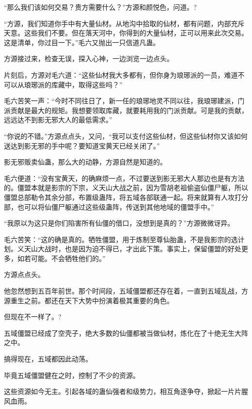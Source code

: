 
\begin{this_body}



“那么我们该如何交易？贵方需要什么？”方源和颜悦色，问道。?

“方源，我们知道你手中有大量仙材。从地沟中拾取的仙材，都有问题，内部充斥天意。这些我们不要。但在落天河中，你得到的大量仙材，正可以用来此次交易。这是清单，你过目一下。”毛六又抛出一只信道凡蛊。

方源接过来，检查无误，探入心神，一边浏览一边点头。

片刻后，方源对毛六道：“这些仙材我大多都有，但你身为琅琊派的一员，难道不可以从琅琊派的库藏中，取得这些吗？”

毛六苦笑一声：“今时不同往日了，新一任的琅琊地灵不同以往，我琅琊建派，门派贡献是最大的规矩。我想要领取库藏，就要耗用我的门派贡献。可是我的贡献，远远达不到影无邪大人的最低需求。”

“你说的不错。”方源点点头，又问，“我可以支付这些仙材，但这些仙材你又该如何送达到影无邪的手中呢？要知道宝黄天已经关闭了。”

影无邪贩卖仙蛊，那么大的动静，方源自然是知道的。

毛六便道：“没有宝黄天，的确麻烦一点，不过要送到影无邪大人那边也是有方法的。僵盟本就是影宗的下宗，义天山大战之前，因为雪胡老祖偷盗仙僵尸躯，所以僵盟总部勒令其余分部，布置级蛊阵，将五域各部联通一起。将来就算有人攻打分部，也可以将仙僵尸躯通过这些级蛊阵，传送到其他地域的僵盟手中。”

“我原以为这只是你们陷害所有仙僵的借口，没想到是真的？”方源微微讶异。

毛六苦笑：“这的确是真的。牺牲僵盟，用于炼制至尊仙胎蛊，不是我影宗的选计划。义天山大战时，也是因为迫不得已，才出此下策。事实上，保留僵盟的好处更多，如若可能。不会牺牲他们的。”

方源点点头。

他忽然想到五百年前世。那个时间段，五域僵盟都还存在着，一直到五域乱战，方源重生之前。都还在天下大势中扮演着极其重要的角色。

但现在不一样了。?

五域僵盟已经成了空壳子，绝大多数的仙僵都被当做仙材，炼化在了十绝无生大阵之中。

搞得现在，五域都因此动荡。

毕竟五域僵盟健在之时，控制了不少的资源。

这些资源如今无主。引起各域的蛊仙强者和级势力，相互角逐争夺，掀起一片片腥风血雨。


\end{this_body}
